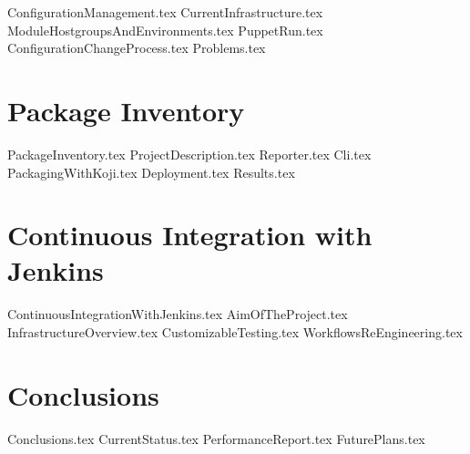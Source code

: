 \documentclass[12pt,a4paper,openright]{report}
\begin{document}
{ConfigurationManagement.tex}
{CurrentInfrastructure.tex}
{ModuleHostgroupsAndEnvironments.tex}
{PuppetRun.tex}
{ConfigurationChangeProcess.tex}
{Problems.tex}

\chapter{Package Inventory}

{PackageInventory.tex}
{ProjectDescription.tex}
{Reporter.tex}
{Cli.tex}
{PackagingWithKoji.tex}
{Deployment.tex}
{Results.tex}

\chapter{Continuous Integration with Jenkins}

{ContinuousIntegrationWithJenkins.tex}
{AimOfTheProject.tex}
{InfrastructureOverview.tex}
{CustomizableTesting.tex}
{WorkflowsReEngineering.tex}

\chapter{Conclusions}

{Conclusions.tex}
{CurrentStatus.tex}
{PerformanceReport.tex}
{FuturePlans.tex}



\end{document}

